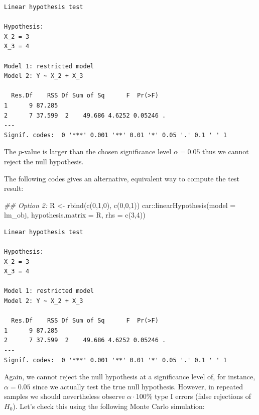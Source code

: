 \documentclass[
  letterpaper,
  DIV=11,
  numbers=noendperiod]{scrreprt}
\newenvironment{Shaded}{\begin{snugshade}}{\end{snugshade}}
\newcommand{\AttributeTok}[1]{\textcolor[rgb]{0.40,0.45,0.13}{#1}}
\newcommand{\DecValTok}[1]{\textcolor[rgb]{0.68,0.00,0.00}{#1}}
\newcommand{\DocumentationTok}[1]{\textcolor[rgb]{0.37,0.37,0.37}{\textit{#1}}}
\newcommand{\FunctionTok}[1]{\textcolor[rgb]{0.28,0.35,0.67}{#1}}
\newcommand{\NormalTok}[1]{\textcolor[rgb]{0.00,0.23,0.31}{#1}}
\newcommand{\OtherTok}[1]{\textcolor[rgb]{0.00,0.23,0.31}{#1}}
\newcommand{\SpecialCharTok}[1]{\textcolor[rgb]{0.37,0.37,0.37}{#1}}
\theoremstyle{definition}
\theoremstyle{plain}
\theoremstyle{plain}
\theoremstyle{remark}
\begin{document}
\begin{verbatim}
Linear hypothesis test

Hypothesis:
X_2 = 3
X_3 = 4

Model 1: restricted model
Model 2: Y ~ X_2 + X_3

  Res.Df    RSS Df Sum of Sq      F  Pr(>F)  
1      9 87.285                              
2      7 37.599  2    49.686 4.6252 0.05246 .
---
Signif. codes:  0 '***' 0.001 '**' 0.01 '*' 0.05 '.' 0.1 ' ' 1
\end{verbatim}

The \(p\)-value is larger than the chosen significance level
\(\alpha=0.05\) thus we cannot reject the null hypothesis.

The following codes gives an alternative, equivalent way to compute the
test result:

\begin{Shaded}
\begin{Highlighting}[]
\DocumentationTok{\#\# Option 2:}
\NormalTok{R }\OtherTok{\textless{}{-}} \FunctionTok{rbind}\NormalTok{(}\FunctionTok{c}\NormalTok{(}\DecValTok{0}\NormalTok{,}\DecValTok{1}\NormalTok{,}\DecValTok{0}\NormalTok{),}
           \FunctionTok{c}\NormalTok{(}\DecValTok{0}\NormalTok{,}\DecValTok{0}\NormalTok{,}\DecValTok{1}\NormalTok{))}
\NormalTok{car}\SpecialCharTok{::}\FunctionTok{linearHypothesis}\NormalTok{(}\AttributeTok{model =}\NormalTok{ lm\_obj, }
                      \AttributeTok{hypothesis.matrix =}\NormalTok{ R, }
                      \AttributeTok{rhs =} \FunctionTok{c}\NormalTok{(}\DecValTok{3}\NormalTok{,}\DecValTok{4}\NormalTok{))}
\end{Highlighting}
\end{Shaded}

\begin{verbatim}
Linear hypothesis test

Hypothesis:
X_2 = 3
X_3 = 4

Model 1: restricted model
Model 2: Y ~ X_2 + X_3

  Res.Df    RSS Df Sum of Sq      F  Pr(>F)  
1      9 87.285                              
2      7 37.599  2    49.686 4.6252 0.05246 .
---
Signif. codes:  0 '***' 0.001 '**' 0.01 '*' 0.05 '.' 0.1 ' ' 1
\end{verbatim}

Again, we cannot reject the null hypothesis at a significance level of,
for instance, \(\alpha=0.05\) since we actually test the true null
hypothesis. However, in repeated samples we should nevertheless observe
\(\alpha\cdot 100\%\) type I errors (false rejections of \(H_0\)). Let's
check this using the following Monte Carlo simulation:
\end{document}
